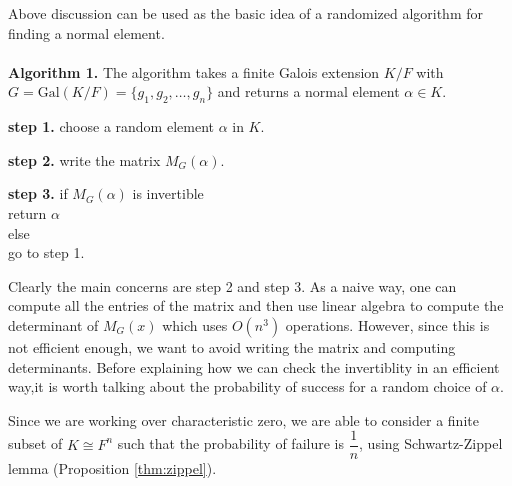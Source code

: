 \documentclass[sigconf]{acmart}
\theoremstyle{acmplain}
\begin{document}
 
 Above discussion can be used as the basic idea of a randomized algorithm for finding a
 normal element.\\
 \\
 \textbf{Algorithm 1.} \label{alg:naive}
 The algorithm takes a finite Galois extension $K/F$ with 
 $G =  \mathrm{Gal}(K/F) = \lbrace g_1, g_2, \ldots , g_n \rbrace$ and returns a normal
 element $\alpha \in K$.
 \begin{description}
 \item \textbf{step 1.} choose a random element $\alpha$ in $K$.
 \item \textbf{step 2.} write the matrix $M_G(\alpha)$.
 \item \textbf{step 3.} if $ M_G(\alpha)$ is invertible\\
 \hspace{10cm} return $\alpha$\\
 \hspace{2cm} else \\
 \hspace{5cm} go to step 1.\\  
 \end{description}
 
 Clearly the main concerns are step 2 and step 3. As a naive way, one can compute all the entries of the matrix and then 
 use linear algebra to compute the determinant of $M_G(x)$ which uses $O(n^3)$ operations. However, since this is not efficient
 enough, we want to avoid writing the matrix and computing determinants. Before explaining how we can check the invertiblity 
 in an efficient way,it is worth talking about the probability of success for a random choice of $\alpha$.
 
 Since we are working over characteristic zero, we are able to consider a finite subset
 of $K \cong F^n$ such that the probability of failure is $\dfrac{1}{n}$, using 
 Schwartz-Zippel lemma (Proposition \ref{thm:zippel}).
 
\end{document}
